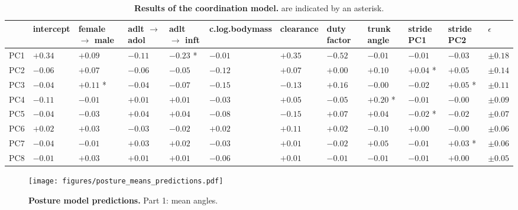\begin{landscape}
\begin{table}[b!]
\caption{\label{tab:coordinationresults}\textbf{Results of the coordination model.}  are indicated by an asterisk.}
\centering
\scriptsize
\begin{tabular}{llllllllllll}
 & intercept & female \(\rightarrow\) male & adlt \(\rightarrow\) adol & adlt \(\rightarrow\) inft & c.log.bodymass & clearance & duty factor & trunk angle & stride PC1 & stride PC2 & \(\epsilon\)\\[0pt]
\hline
PC1 & \(+0.34\) & \(+0.09\) & \(-0.11\) & \(-0.23\) * & \(-0.01\) & \(+0.35\) & \(-0.52\) & \(-0.01\) & \(-0.01\) & \(-0.03\) & \(\pm 0.18\)\\[0pt]
PC2 & \(-0.06\) & \(+0.07\) & \(-0.06\) & \(-0.05\) & \(-0.12\) & \(+0.07\) & \(+0.00\) & \(+0.10\) & \(+0.04\) * & \(+0.05\) & \(\pm 0.14\)\\[0pt]
PC3 & \(-0.04\) & \(+0.11\) * & \(-0.04\) & \(-0.07\) & \(-0.15\) & \(-0.13\) & \(+0.16\) & \(-0.00\) & \(-0.02\) & \(+0.05\) * & \(\pm 0.11\)\\[0pt]
PC4 & \(-0.11\) & \(-0.01\) & \(+0.01\) & \(+0.01\) & \(-0.03\) & \(+0.05\) & \(-0.05\) & \(+0.20\) * & \(-0.01\) & \(-0.00\) & \(\pm 0.09\)\\[0pt]
PC5 & \(-0.04\) & \(-0.03\) & \(+0.04\) & \(+0.04\) & \(-0.08\) & \(-0.15\) & \(+0.07\) & \(+0.04\) & \(-0.02\) * & \(-0.02\) & \(\pm 0.07\)\\[0pt]
PC6 & \(+0.02\) & \(+0.03\) & \(-0.03\) & \(-0.02\) & \(+0.02\) & \(+0.11\) & \(+0.02\) & \(-0.10\) & \(+0.00\) & \(-0.00\) & \(\pm 0.06\)\\[0pt]
PC7 & \(-0.04\) & \(-0.01\) & \(+0.03\) & \(+0.02\) & \(-0.03\) & \(+0.01\) & \(-0.02\) & \(+0.05\) & \(-0.01\) & \(+0.03\) * & \(\pm 0.06\)\\[0pt]
PC8 & \(-0.01\) & \(+0.03\) & \(+0.01\) & \(+0.01\) & \(-0.06\) & \(+0.01\) & \(-0.01\) & \(-0.01\) & \(-0.01\) & \(+0.00\) & \(\pm 0.05\)\\[0pt]
\end{tabular}
\end{table}
\end{landscape}
\clearpage

\begin{figure}[h!]
\centering
\texttt{[image: figures/posture\_means\_predictions.pdf]}
\caption{\label{fig:posture1}\textbf{Posture model predictions.} Part 1: mean  angles.}
\end{figure}

